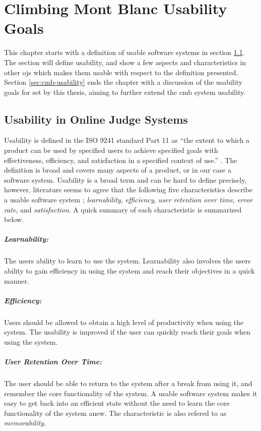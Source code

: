 \chapter{Climbing Mont Blanc Usability Goals}
\label{ch:design}
This chapter starts with a definition of usable software systems in section \ref{sec:usability-def}. The section will define usability, and show a few aspects and characteristics in other \glspl{oj} which makes them usable with respect to the definition presented. Section \ref{sec:cmb-usability} ends the chapter with a discussion of the usability goals for set by this thesis, aiming to further extend the \gls{cmb} system usability.

\section{Usability in Online Judge Systems}
\label{sec:usability-def}
Usability is defined in the ISO 9241 standard Part 11 as ``the extent to which a product can be used by specified users to achieve specified goals with effectiveness, efficiency, and satisfaction in a specified context of use.'' \cite{ISO1998}. The definition is broad and covers many aspects of a product, or in our case a software system. Usability is a broad term and can be hard to define precisely, however, literature seems to agree that the following five characteristics describe a usable software system  \cite{holzinger2005, ferre2001}; \textit{learnability}, \textit{efficiency}, \textit{user retention over time}, \textit{error rate}, and \textit{satisfaction}. A quick summary of each characteristic is summarized below.

\paragraph*{Learnability:} The users ability to learn to use the system. Learnability also involves the users ability to gain efficiency in using the system and reach their objectives in a quick manner.

\paragraph*{Efficiency:} Users should be allowed to obtain a high level of productivity when using the system. The usability is improved if the user can quickly reach their goals when using the system.

\paragraph*{User Retention Over Time:} The user should be able to return to the system after a break from using it, and remember the core functionality of the system. A usable software system makes it easy to get back into an efficient state without the need to learn the core functionality of the system anew. The characteristic is also refered to as \textit{memorability}.

